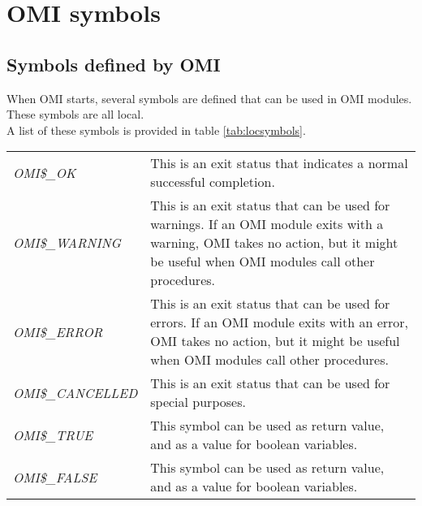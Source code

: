 \documentclass[a4paper]{book}
\begin{document}
\section{OMI symbols}
\label{subsec:mylabel7}

\subsection{Symbols defined by OMI}
\label{subsubsec:symbols}


When OMI starts, several symbols are defined that can be used in OMI 
modules. These symbols are all local. \\
A list of these symbols is provided in table \ref{tab:locsymbols}.

\begin{table}[h!tb]
\begin{minipage}[h!tb]{\textwidth}
\begin{tabular}{lp{9cm}} \hline
\textsl{OMI{\$}{\_}OK}\index{return values}\index{OMI{\$}{\_}OK}\index{OMI symbols!local symbols!OMI{\$}{\_}OK} & 
This is an exit status that indicates a normal successful completion. \\
\textsl{OMI{\$}{\_}WARNING}\index{return values}\index{OMI{\$}{\_}WARNING}\index{OMI symbols!local symbols!OMI{\$}{\_}WARNING} & 
This is an exit status that can be used for warnings. If an 
OMI module exits with a warning, OMI takes no action, but 
it might be useful when OMI modules call other procedures. \\
\textsl{OMI{\$}{\_}ERROR}\index{return values}\index{OMI{\$}{\_}ERROR}\index{OMI symbols!local symbols!OMI{\$}{\_}ERROR} & 
This is an exit status that can be used for errors. If an OMI 
module exits with an error, OMI takes no action, but it 
might be useful when OMI modules call other procedures. \\
\textsl{OMI{\$}{\_}CANCELLED}\index{return values}\index{OMI{\$}{\_}CANCELLED}\index{OMI symbols!local symbols!OMI{\$}{\_}CANCELLED} & 
This is an exit status that can be used for special purposes. \\
\textsl{OMI{\$}{\_}TRUE}\index{OMI{\$}{\_}TRUE}\index{OMI symbols!local symbols!OMI{\$}{\_}TRUE} & 
This symbol can be used as return value, and as a value for boolean variables. \\
\textsl{OMI{\$}{\_}FALSE}\index{OMI{\$}{\_}FALSE}\index{OMI symbols!local symbols!OMI{\$}{\_}FALSE} & 
This symbol can be used as return value, and as a value for boolean variables. \\

\end{tabular}
\end{minipage}
\end{table}
\end{document}
